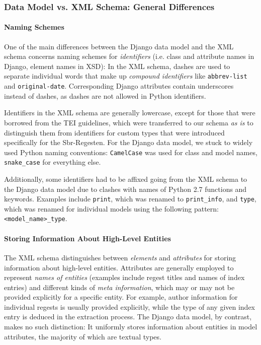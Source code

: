 \subsubsection{Data Model vs. XML Schema: General Differences}
\label{sec:gen-diff}

\paragraph{Naming Schemes}

One of the main differences between the Django data model and the XML
schema concerns naming schemes for \emph{identifiers} (i.e. class and
attribute names in Django, element names in XSD): In the XML schema,
dashes are used to separate individual words that make up
\emph{compound identifiers} like \texttt{abbrev-list} and
\texttt{original-date}. Corresponding Django attributes contain
underscores instead of dashes, as dashes are not allowed in Python
identifiers.

Identifiers in the XML schema are generally lowercase, except for
those that were borrowed from the TEI guidelines, which were
transferred to our schema \emph{as is} to distinguish them from
identifiers for custom types that were introduced specifically for the
Sbr-Regesten. For the Django data model, we stuck to widely used
Python naming conventions: \texttt{CamelCase} was used for class and
model names, \texttt{snake\_case} for everything else.

Additionally, some identifiers had to be affixed going from the XML
schema to the Django data model due to clashes with names of Python
2.7 functions and keywords. Examples include \texttt{print}, which was
renamed to \texttt{print\_info}, and \texttt{type}, which was renamed
for individual models using the following pattern:
\texttt{<model\_name>\_type}.

\paragraph{Storing Information About High-Level Entities}

The XML schema distinguishes between \emph{elements} and
\emph{attributes} for storing information about high-level entities.
Attributes are generally employed to represent \emph{names of
  entities} (examples include regest titles and names of index
entries) and different kinds of \emph{meta information}, which may or
may not be provided explicitly for a specific entity. For example,
author information for individual regests is usually provided
explicitly, while the type of any given index entry is deduced in the
extraction process. The Django data model, by contrast, makes no such
distinction: It uniformly stores information about entities in model
attributes, the majority of which are textual types.

